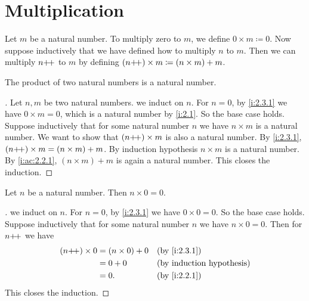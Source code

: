 \section{Multiplication}\label{i:sec:2.3}

\begin{defn}\label{i:2.3.1}
  Let \(m\) be a natural number.
  To multiply zero to \(m\), we define \(0 \times m \coloneqq 0\).
  Now suppose inductively that we have defined how to multiply \(n\) to \(m\).
  Then we can multiply \(n{+}\!{+}\) to \(m\) by defining \((n{+}\!{+}) \times m \coloneqq (n \times m) + m\).
\end{defn}

\begin{ac}\label{i:ac:2.3.1}
  The product of two natural numbers is a natural number.
\end{ac}

\begin{proof}[]
  Let \(n, m\) be two natural numbers.
  we induct on \(n\).
  For \(n = 0\), by \cref{i:2.3.1} we have \(0 \times m = 0\), which is a natural number by \cref{i:2.1}.
  So the base case holds.
  Suppose inductively that for some natural number \(n\) we have \(n \times m\) is a natural number.
  We want to show that \((n{+}\!{+}) \times m\) is also a natural number.
  By \cref{i:2.3.1}, \((n{+}\!{+}) \times m = (n \times m) + m\).
  By induction hypothesis \(n \times m\) is a natural number.
  By \cref{i:ac:2.2.1}, \((n \times m) + m\) is again a natural number.
  This closes the induction.
\end{proof}

\begin{ac}\label{i:ac:2.3.2}
  Let \(n\) be a natural number.
  Then \(n \times 0 = 0\).
\end{ac}

\begin{proof}[]
  we induct on \(n\).
  For \(n = 0\), by \cref{i:2.3.1} we have \(0 \times 0 = 0\).
  So the base case holds.
  Suppose inductively that for some natural number \(n\) we have \(n \times 0 = 0\).
  Then for \(n{+}\!{+}\) we have
  \begin{align*}
    (n\pp) \times 0 & = (n \times 0) + 0 &  & \by{i:2.3.1} \\
                    & = 0 + 0            &  & \byIH        \\
                    & = 0.               &  & \by{i:2.2.1}
  \end{align*}
  This closes the induction.
\end{proof}

